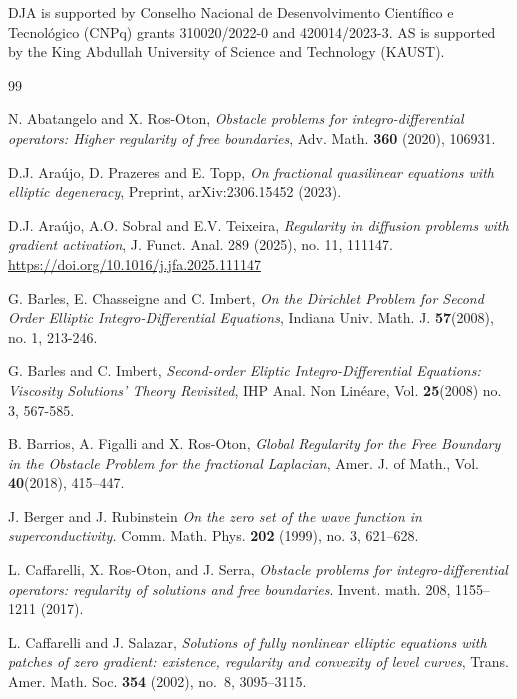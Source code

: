 \documentclass[reqno,11pt]{amsart}
\numberwithin{equation}{section}
\numberwithin{equation}{section}
\begin{document}
{\small {} DJA is supported by Conselho Nacional de Desenvolvimento Científico e Tecnológico (CNPq) grants 310020/2022-0 and 420014/2023-3. AS is supported by the King Abdullah University of Science and Technology (KAUST).}

\begin{thebibliography}{99}

 N. Abatangelo and X. Ros-Oton, \textit{Obstacle problems for integro-differential operators: Higher regularity of free boundaries}, Adv. Math. \textbf{360} (2020), 106931.

 D.J. Araújo, D. Prazeres and E. Topp, \textit{On fractional quasilinear equations with elliptic degeneracy}, Preprint, arXiv:2306.15452 (2023).

 D.J. Araújo, A.O. Sobral and E.V. Teixeira, 
\textit{Regularity in diffusion problems with gradient activation}, J. Funct. Anal. 289 (2025), no. 11, 111147. \href{https://doi.org/10.1016/j.jfa.2025.111147}{https://doi.org/10.1016/j.jfa.2025.111147}

 G. Barles, E. Chasseigne and C. Imbert, \textit{On the Dirichlet Problem for Second Order Elliptic Integro-Differential Equations}, Indiana Univ. Math. J. \textbf{57}(2008), no. 1, 213-246.

 G. Barles and C. Imbert, \textit{Second-order Eliptic Integro-Differential Equations: Viscosity Solutions' Theory Revisited}, IHP Anal. Non Linéare, Vol. \textbf{25}(2008) no. 3, 567-585.

 B. Barrios, A. Figalli and X. Ros-Oton, \textit{Global Regularity for the Free Boundary in the Obstacle Problem for the fractional Laplacian}, Amer. J. of Math., Vol. \textbf{40}(2018), 415--447.

 J. Berger and  J. Rubinstein
{\it On the zero set of the wave function in superconductivity.}   Comm. Math. Phys. {\bf 202} (1999), no. 3, 621--628.

 L. Caffarelli, X. Ros-Oton, and J. Serra, \textit{Obstacle problems for integro-differential operators: regularity of solutions and free boundaries}. Invent. math. 208, 1155--1211 (2017).

 L. Caffarelli and J. Salazar, \textit{Solutions of fully nonlinear elliptic equations with patches of zero gradient: existence, regularity and convexity of level curves}, Trans. Amer. Math. Soc. {\bf 354} (2002), no.~8, 3095--3115.


\end{thebibliography}
\end{document}
